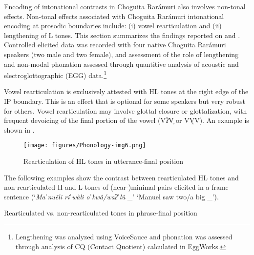 Encoding of intonational contrasts in Choguita Rarámuri also involves non-tonal effects. Non-tonal effects associated with Choguita Rarámuri intonational encoding at prosodic boundaries include: (i) vowel rearticulation and (ii) lengthening of L tones. This section summarizes the findings reported on \citet{caballero2014tone} and \citet{aguilar2015multi}. Controlled elicited data was recorded with four native Choguita Rarámuri speakers (two male and two female), and assessment of the role of lengthening and non-modal phonation assessed through quantitive analysis of acoustic and electroglottographic (EGG) data.\footnote{Lengthening was analyzed using VoiceSauce \parencite{shue2011voicesauce} and phonation was assessed through analysis of CQ (Contact Quotient) calculated in EggWorks.}

Vowel rearticulation is exclusively attested with HL tones at the right edge of the IP boundary. This is an effect that is optional for some speakers but very robust for others. Vowel rearticulation may involve glottal closure or glottalization, with frequent devoicing of the final portion of the vowel (VʔV̥ or VV̰V). An example is shown in .

\begin{figure}
\texttt{[image: figures/Phonology-img6.png]}
\caption{
\label{fig: Rearticulation of HL tones}
Rearticulation of HL tones in utterance-final position \parencite{caballero2014tone}}
\end{figure}


The following examples show the contrast between rearticulated HL tones and non-rearticulated H and L tones of (near-)minimal pairs elicited in a frame sentence (`\textit{Maˈnuêli riˈwàli oˈkwâ/waʔˈlû} \_' ‘Manuel saw two/a big \_’).


\ea\label{ex: rearticulated vs. non-rearticulated tones}
{Rearticulated vs. non-rearticulated tones in phrase-final position}

